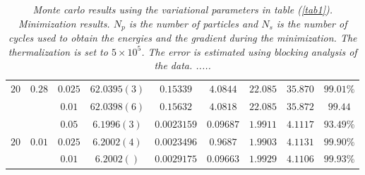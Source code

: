 \documentclass[a4paper,10pt,twocolumn]{article} %
\begin{document}
\begin{table*}[ht!]
\begin{center}
\begin{tabular}{|c|c|c|c|c|c|c|c|c|}
$20$& $0.28$& $0.025$  & $62.0395(3)$ & $0.15339$ & $4.0844$ & $22.085$ & $35.870$ & $99.01\%$\\ 	
	& 	 	& $0.01$   & $62.0398(6)$ & $0.15632$ & $4.0818$ & $22.085$ & $35.872$ & $99.44$\\
\hline
	& 		& $0.05$  & $6.1996(3)$ & $0.0023159$ & $0.09687$ & $1.9911$ & $4.1117$ & $93.49\%$\\
$20$&$0.01$ & $0.025$ & $6.2002(4)$ & $0.0023496$ &$0.9687$ & $1.9903$ & $4.1131$ & $99.90\%$\\ 
	&  		& $0.01$  & $6.2002()$ & $0.0029175$ & $0.09663$ & $1.9929$ & $4.1106$ & $99.93\%$\\ 
\hline
\end{tabular}
\end{center}
\caption{{\it 
	Monte carlo results using the variational parameters in table (\ref{tab1}).
	Minimization results. $N_p$ is the number of particles and $N_s$ is the number of cycles used to obtain the energies and the gradient during the minimization.
	The thermalization is set to $5\times 10^5$. The error is estimated using blocking analysis of the data.  .....
}}
\label{tab2}
\end{table*}


\end{document}
